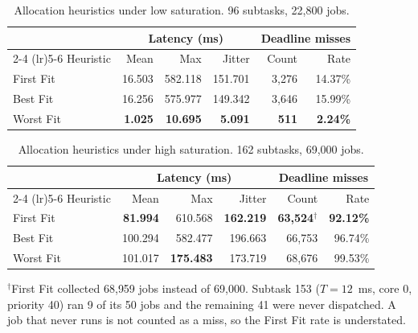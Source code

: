 %

\begin{table}[tb]
  \centering
  \footnotesize
  \caption{Allocation heuristics under low saturation. 96 subtasks, 22{,}800 jobs.}
  \label{tab:heuristics-low}
  \begin{tabular}{lrrrrr}
    \toprule
    & \multicolumn{3}{c}{Latency (ms)} & \multicolumn{2}{c}{Deadline misses} \\
    \cmidrule(lr){2-4} \cmidrule(lr){5-6}
    Heuristic & Mean & Max & Jitter & Count & Rate \\
    \midrule
    First Fit & 16.503 & 582.118 & 151.701 & 3{,}276 & 14.37\% \\
    Best Fit  & 16.256 & 575.977 & 149.342 & 3{,}646 & 15.99\% \\
    Worst Fit & \textbf{1.025} & \textbf{10.695} & \textbf{5.091} & \textbf{511} & \textbf{2.24\%} \\
    \bottomrule
  \end{tabular}
\end{table}

\begin{table}[tb]
  \centering
  \footnotesize
  \caption{Allocation heuristics under high saturation. 162 subtasks, 69{,}000 jobs.}
  \label{tab:heuristics-high}
  \begin{tabular}{lrrrrr}
    \toprule
    & \multicolumn{3}{c}{Latency (ms)} & \multicolumn{2}{c}{Deadline misses} \\
    \cmidrule(lr){2-4} \cmidrule(lr){5-6}
    Heuristic & Mean & Max & Jitter & Count & Rate \\
    \midrule
    First Fit & \textbf{81.994} & 610.568 & \textbf{162.219} & \textbf{63{,}524}$^{\dagger}$ & \textbf{92.12\%} \\
    Best Fit  & 100.294 & 582.477 & 196.663 & 66{,}753 & 96.74\% \\
    Worst Fit & 101.017 & \textbf{175.483} & 173.719 & 68{,}676 & 99.53\% \\
    \bottomrule
  \end{tabular}

  \vspace{2pt}
  \footnotesize
  \raggedright
  $^{\dagger}$First Fit collected 68{,}959 jobs instead of 69{,}000. Subtask 153
  ($T = 12$~ms, core 0, priority 40) ran 9 of its 50 jobs and the remaining 41 were
  never dispatched. A job that never runs is not counted as a miss, so the First Fit
  rate is understated.
\end{table}
